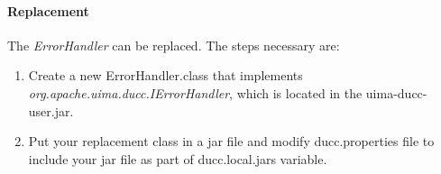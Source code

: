 \begin{sloppypar}
\paragraph {Replacement} The {\em ErrorHandler} can be replaced.  The steps necessary are:
\begin{enumerate}
\item Create a new ErrorHandler.class that implements {\em org.apache.uima.ducc.IErrorHandler}, which is located in the uima-ducc-user.jar.
\item Put your replacement class in a jar file and modify ducc.properties file to include your jar file as part of ducc.local.jars variable.
\end{enumerate}

\end{sloppypar}
